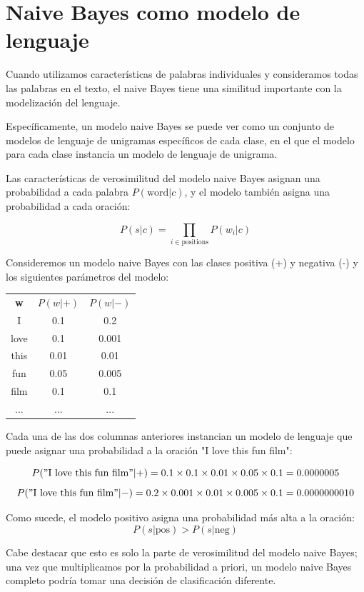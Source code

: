 \documentclass[11pt,fleqn]{book} %
\begin{document}
\section{Naive Bayes como modelo de lenguaje}

Cuando utilizamos características de palabras individuales y consideramos todas las palabras en el texto, el naive Bayes tiene una similitud importante con la modelización del lenguaje.

Específicamente, un modelo naive Bayes se puede ver como un conjunto de modelos de lenguaje de unigramas específicos de cada clase, en el que el modelo para cada clase instancia un modelo de lenguaje de unigrama.

Las características de verosimilitud del modelo naive Bayes asignan una probabilidad a cada palabra $P(\text{word}|c)$, y el modelo también asigna una probabilidad a cada oración:

\[P(s|c) = \prod_{i\in \text{positions}} P(w_i|c)\]

Consideremos un modelo naive Bayes con las clases positiva (+) y negativa (-) y los siguientes parámetros del modelo:

\begin{center}
\begin{tabular}{ccc}
\textbf{w} & $P(w|+)$ & $P(w|-)$ \\
I & 0.1 & 0.2 \\
love & 0.1 & 0.001 \\
this & 0.01 & 0.01 \\
fun & 0.05 & 0.005 \\
film & 0.1 & 0.1 \\
... & ... & ...
\end{tabular}
\end{center}

Cada una de las dos columnas anteriores instancian un modelo de lenguaje que puede asignar una probabilidad a la oración "I love this fun film":

\[P("\text{I love this fun film}"|+) = 0.1 \times 0.1 \times 0.01 \times 0.05 \times 0.1 = 0.0000005\]
\[P("\text{I love this fun film}"|-) = 0.2 \times 0.001 \times 0.01 \times 0.005 \times 0.1 = 0.0000000010\]

Como sucede, el modelo positivo asigna una probabilidad más alta a la oración:
\[P(s|\text{pos}) > P(s|\text{neg})\]

Cabe destacar que esto es solo la parte de verosimilitud del modelo naive Bayes; una vez que multiplicamos por la probabilidad a priori, un modelo naive Bayes completo podría tomar una decisión de clasificación diferente.
\end{document}
